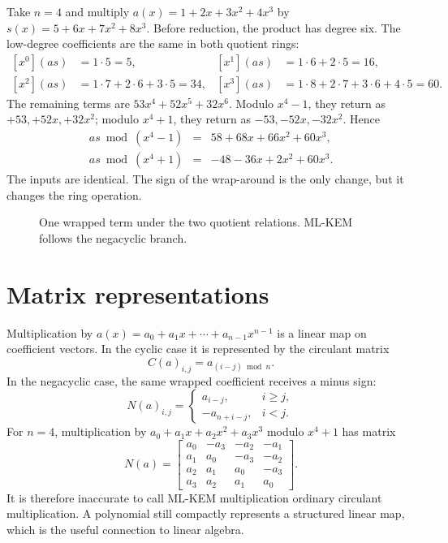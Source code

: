 Take $n=4$ and multiply $a(x)=1+2x+3x^2+4x^3$ by $s(x)=5+6x+7x^2+8x^3$. Before reduction, the product has degree six. The low-degree coefficients are the same in both quotient rings:
\[
\begin{aligned}
[x^0](as)&=1\cdot5=5, & [x^1](as)&=1\cdot6+2\cdot5=16,\\
[x^2](as)&=1\cdot7+2\cdot6+3\cdot5=34, & [x^3](as)&=1\cdot8+2\cdot7+3\cdot6+4\cdot5=60.
\end{aligned}
\]
The remaining terms are $53x^4+52x^5+32x^6$. Modulo $x^4-1$, they return as $+53,+52x,+32x^2$; modulo $x^4+1$, they return as $-53,-52x,-32x^2$. Hence
\[
\begin{array}{rcl}
as\bmod(x^4-1)&=&58+68x+66x^2+60x^3,\\
as\bmod(x^4+1)&=&-48-36x+2x^2+60x^3.
\end{array}
\]
The inputs are identical. The sign of the wrap-around is the only change, but it changes the ring operation.

\begin{figure}[H]
\centering
{}
\caption{One wrapped term under the two quotient relations. ML-KEM follows the negacyclic branch.}
\label{fig:cyclic-vs-negacyclic}
\end{figure}

\section{Matrix representations}

Multiplication by $a(x)=a_0+a_1x+\cdots+a_{n-1}x^{n-1}$ is a linear map on coefficient vectors. In the cyclic case it is represented by the circulant matrix
\[
C(a)_{i,j}=a_{(i-j)\bmod n}.
\]
In the negacyclic case, the same wrapped coefficient receives a minus sign:
\[
N(a)_{i,j}=\begin{cases}
 a_{i-j},&i\ge j,\\
 -a_{n+i-j},&i<j.
\end{cases}
\]
For $n=4$, multiplication by $a_0+a_1x+a_2x^2+a_3x^3$ modulo $x^4+1$ has matrix
\[
N(a)=
\begin{bmatrix}
a_0&-a_3&-a_2&-a_1\\
a_1&a_0&-a_3&-a_2\\
a_2&a_1&a_0&-a_3\\
a_3&a_2&a_1&a_0
\end{bmatrix}.
\]
It is therefore inaccurate to call ML-KEM multiplication ordinary circulant multiplication. A polynomial still compactly represents a structured linear map, which is the useful connection to linear algebra.

